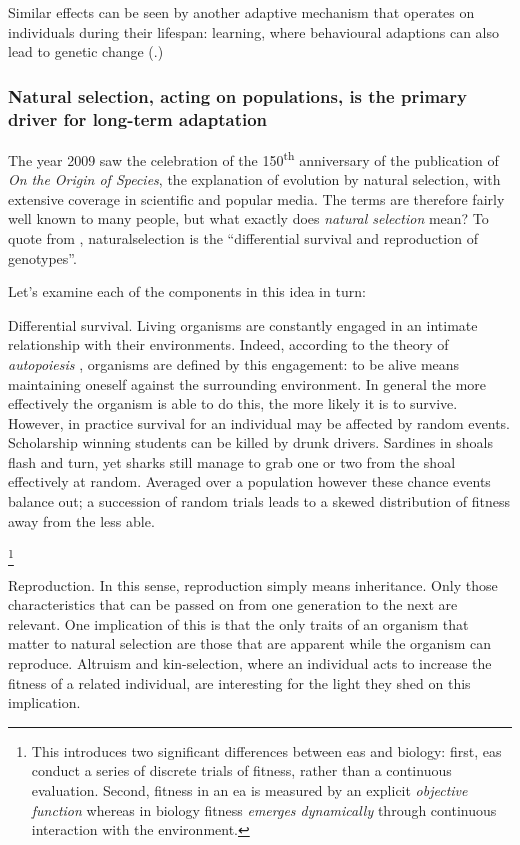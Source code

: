 Similar effects can be seen by another adaptive mechanism that operates
on individuals during their lifespan: learning, where behavioural
adaptions can also lead to genetic change
(\eg \autocite{Hinton:1987vy}.)

\subsubsection{Natural selection, acting on populations, is the primary driver for long-term adaptation}
\label{natural-selection-acting-on-populations-is-the-primary-driver-for-long-term-adaptation}

The year 2009 saw the celebration of the 150\textsuperscript{th}
anniversary of the publication of \emph{On the Origin of Species}, the
explanation of evolution by natural selection, with extensive coverage
in scientific and popular media. The terms are therefore fairly well
known to many people, but what exactly does \emph{natural selection}
mean? To quote from \autocite{Futuyama:1979tg}, \gls{naturalselection}
is the ``differential survival and reproduction of genotypes''.

Let's examine each of the components in this idea in turn:

Differential survival. Living organisms are constantly engaged in an
intimate relationship with their environments. Indeed, according to the
theory of \emph{autopoiesis} \autocite{Varela:1974qd}, organisms are
defined by this engagement: to be alive means maintaining oneself
against the surrounding environment. In general the more effectively the
organism is able to do this, the more likely it is to survive. However,
in practice survival for an individual may be affected by random events.
Scholarship winning students can be killed by drunk drivers. Sardines in
shoals flash and turn, yet sharks still manage to grab one or two from
the shoal effectively at random. Averaged over a population however
these chance events balance out; a succession of random trials leads to
a skewed distribution of fitness away from the less able.

\footnote{This introduces two significant differences between \glspl{ea}
	and biology: first, \glspl{ea} conduct a series of discrete trials of fitness,
	rather than a continuous evaluation. Second, fitness in an \gls{ea} is
	measured by an explicit \emph{objective function} whereas in biology
	fitness \emph{emerges dynamically} through continuous interaction with
the environment.}

Reproduction. In this sense, reproduction simply means inheritance. Only
those characteristics that can be passed on from one generation to the
next are relevant. One implication of this is that the only traits of an
organism that matter to natural selection are those that are apparent
while the organism can reproduce. Altruism and kin-selection, where an
individual acts to increase the fitness of a related individual, are
interesting for the light they shed on this implication.

